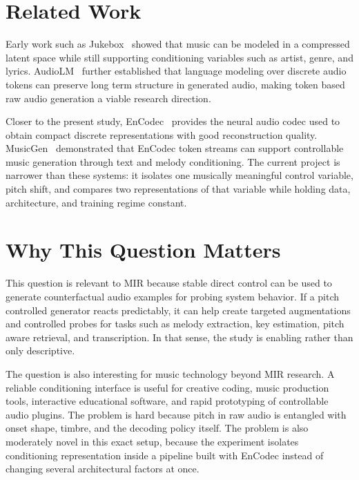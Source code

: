 \documentclass{article}
\begin{document}
\section{Related Work}\label{sec:related_work}

Early work such as Jukebox~\cite{dhariwal2020jukebox} showed that music can be modeled in a compressed latent space while still supporting conditioning variables such as artist, genre, and lyrics. AudioLM~\cite{borsos2023audiolm} further established that language modeling over discrete audio tokens can preserve long term structure in generated audio, making token based raw audio generation a viable research direction.

Closer to the present study, EnCodec~\cite{defossez2022high} provides the neural audio codec used to obtain compact discrete representations with good reconstruction quality. MusicGen~\cite{copet2023simple} demonstrated that EnCodec token streams can support controllable music generation through text and melody conditioning. The current project is narrower than these systems: it isolates one musically meaningful control variable, pitch shift, and compares two representations of that variable while holding data, architecture, and training regime constant.

\section{Why This Question Matters}\label{sec:why_it_matters}

This question is relevant to MIR because stable direct control can be used to generate counterfactual audio examples for probing system behavior. If a pitch controlled generator reacts predictably, it can help create targeted augmentations and controlled probes for tasks such as melody extraction, key estimation, pitch aware retrieval, and transcription. In that sense, the study is enabling rather than only descriptive.

The question is also interesting for music technology beyond MIR research. A reliable conditioning interface is useful for creative coding, music production tools, interactive educational software, and rapid prototyping of controllable audio plugins. The problem is hard because pitch in raw audio is entangled with onset shape, timbre, and the decoding policy itself. The problem is also moderately novel in this exact setup, because the experiment isolates conditioning representation inside a pipeline built with EnCodec instead of changing several architectural factors at once.
\end{document}

